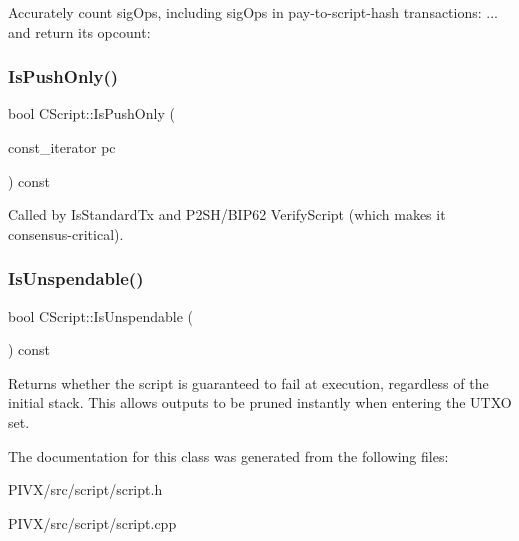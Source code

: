 Accurately count sig\+Ops, including sig\+Ops in pay-\/to-\/script-\/hash transactions\+: ... and return its opcount\+: \mbox{\label{class_c_script_a090905f875fa5a40e616b319de8e973f}} 
\subsubsection{\texorpdfstring{Is\+Push\+Only()}{IsPushOnly()}}
{\footnotesize\ttfamily bool C\+Script\+::\+Is\+Push\+Only (\begin{DoxyParamCaption}\item[{const\+\_\+iterator}]{pc }\end{DoxyParamCaption}) const}

Called by Is\+Standard\+Tx and P2\+S\+H/\+B\+I\+P62 Verify\+Script (which makes it consensus-\/critical). \mbox{\label{class_c_script_a11c26ad1d03fa2d60a733337c21b6719}} 
\subsubsection{\texorpdfstring{Is\+Unspendable()}{IsUnspendable()}}
{\footnotesize\ttfamily bool C\+Script\+::\+Is\+Unspendable (\begin{DoxyParamCaption}{ }\end{DoxyParamCaption}) const\hspace{0.3cm}{\ttfamily [inline]}}

Returns whether the script is guaranteed to fail at execution, regardless of the initial stack. This allows outputs to be pruned instantly when entering the U\+T\+XO set. 

The documentation for this class was generated from the following files\+:\begin{DoxyCompactItemize}
\item 
P\+I\+V\+X/src/script/script.\+h\item 
P\+I\+V\+X/src/script/script.\+cpp\end{DoxyCompactItemize}
